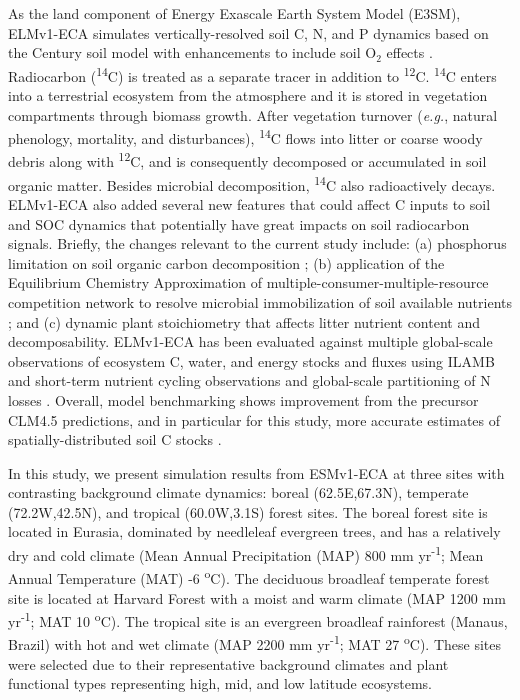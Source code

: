 \documentclass[11pt,a4paper]{article}
\begin{document}
    As the land component of Energy Exascale Earth System Model (E3SM), ELMv1-ECA \citep{Zhu2019} simulates vertically-resolved soil C, N, and P dynamics based on the Century soil model \citep{Parton1993} with enhancements  to include soil O$_2$ effects \citep{Koven2013}. Radiocarbon (\textsuperscript{14}C) is treated as a separate tracer in addition to \textsuperscript{12}C. \textsuperscript{14}C enters into a terrestrial ecosystem from the atmosphere \citep{Graven2017} and it is stored in vegetation compartments through biomass growth. After vegetation turnover (\textit{e.g.}, natural phenology, mortality, and disturbances), \textsuperscript{14}C flows into litter or coarse woody debris  along with \textsuperscript{12}C, and is consequently decomposed or accumulated in soil organic matter. Besides microbial decomposition, \textsuperscript{14}C also radioactively decays. ELMv1-ECA also added several new features that could affect C inputs to soil and SOC dynamics that potentially have great impacts on soil radiocarbon signals. Briefly, the changes relevant to the current study include: (a) phosphorus limitation on soil organic carbon decomposition \citep{zhu2016bg}; (b) application of the Equilibrium Chemistry Approximation of multiple-consumer-multiple-resource competition network to resolve microbial immobilization of soil available nutrients \citep{Tang2013, Zhu2017ea}; and (c) dynamic plant stoichiometry that affects litter nutrient content and decomposability. ELMv1-ECA has been evaluated against multiple global-scale observations of ecosystem C, water, and energy stocks and fluxes using ILAMB \citep{Collier2018, Zhu2019} and short-term nutrient cycling observations and global-scale partitioning of N losses \citep{Zhu2015ncc, Riley2018}. Overall, model benchmarking shows improvement from the precursor CLM4.5 predictions, and in particular for this study, more accurate estimates of spatially-distributed soil C stocks \citep{Zhu2019}.
    
  In this study, we present simulation results from ESMv1-ECA at three sites with contrasting background climate dynamics: boreal (62.5E,67.3N), temperate  (72.2W,42.5N), and tropical (60.0W,3.1S) forest sites. The boreal forest site is located in Eurasia, dominated by needleleaf evergreen trees, and has  a relatively dry and cold climate (Mean Annual Precipitation (MAP) 800 mm yr\textsuperscript{-1}; Mean Annual Temperature (MAT) -6 \textsuperscript{o}C). The deciduous broadleaf temperate forest site is located at Harvard Forest with a moist and warm climate (MAP 1200 mm yr\textsuperscript{-1}; MAT 10 \textsuperscript{o}C). The tropical site is an evergreen broadleaf rainforest (Manaus, Brazil) with hot and wet climate (MAP 2200 mm yr\textsuperscript{-1}; MAT 27 \textsuperscript{o}C). These sites were selected due to their representative background climates and plant functional types representing high, mid, and low latitude ecosystems.
    
\end{document}
